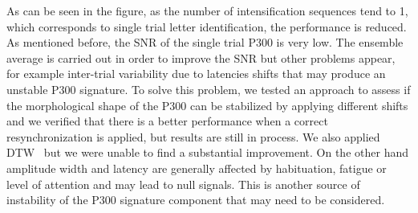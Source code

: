 \documentclass[entropy,article,submit,moreauthors,pdftex,10pt,a4paper]{mdpi}
\begin{document}



As can be seen in the figure, as the number of intensification sequences tend to 1, which corresponds to single trial letter identification, the performance is reduced. As mentioned before, the SNR of the single trial P300 is very low. The ensemble average is carried out in order to improve the SNR but other problems appear, for example inter-trial variability due to latencies shifts that may produce an unstable P300 signature. To solve this problem, we tested an approach to assess if the morphological shape of the P300 can be stabilized by applying different shifts and we verified that there is a better performance when a correct resynchronization is applied, but results are still in process.  We also applied DTW~\citep{Casarotto2005} but we were unable to find a substantial improvement.     On the other hand amplitude width and latency are generally affected by habituation, fatigue or level of attention and may lead to null signals\citep{Ouyang2017}. This is another source of instability of the P300 signature component that may need to be considered.
\end{document}

